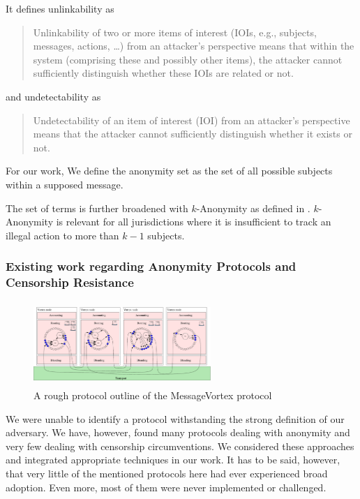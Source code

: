 \documentclass[10pt,journal,compsoc,twocolumn,twoside]{IEEEtran}
\let\MYoriglatexcaption\caption
\renewcommand{\caption}[2][\relax]{\MYoriglatexcaption[#2]{#2}}
\begin{document}
\noindent It defines unlinkability as

\begin{quote}
	Unlinkability of two or more items of interest (IOIs, e.g., subjects, messages, actions, \ldots) from an attacker’s perspective means that within the system (comprising these and possibly other items), the attacker cannot sufficiently distinguish whether these IOIs are related or not.\omitted
\end{quote}

\noindent and undetectability as
\begin{quote}
	Undetectability of an item of interest (IOI) from an attacker’s perspective means that the attacker cannot sufficiently distinguish whether it exists or not.
\end{quote}

For our work, We define the anonymity set as the set of all possible subjects within a supposed message. %

The set of terms is further broadened with $k$-Anonymity as defined in \cite{k-anonymous:ccs2003}. $k$-Anonymity is relevant for all jurisdictions where it is insufficient to track an illegal action to more than $k-1$ subjects.

\subsubsection{Existing work regarding Anonymity Protocols and Censorship Resistance}
\begin{figure}[ht]
	\centering\includegraphics[width=0.6\textwidth,height=90pt]{roughProtocolDesign}
	\caption{A rough protocol outline of the MessageVortex protocol}
	\label{fig:protocolLayers}
\end{figure}

We were unable to identify a protocol withstanding the strong definition of our adversary. We have, however, found many protocols dealing with anonymity and very few dealing with censorship circumventions. We considered these approaches and integrated appropriate techniques in our work. It has to be said, however, that very little of the mentioned protocols here had ever experienced broad adoption. Even more, most of them were never implemented or challenged. 
\end{document}
